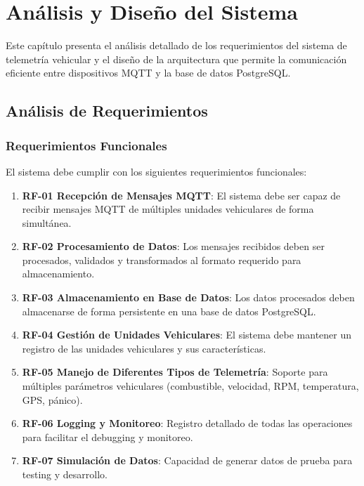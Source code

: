 \chapter{Análisis y Diseño del Sistema}
\label{chap:analisis}

Este capítulo presenta el análisis detallado de los requerimientos del sistema de telemetría vehicular y el diseño de la arquitectura que permite la comunicación eficiente entre dispositivos MQTT y la base de datos PostgreSQL.

\section{Análisis de Requerimientos}

\subsection{Requerimientos Funcionales}

El sistema debe cumplir con los siguientes requerimientos funcionales:

\begin{enumerate}[noitemsep]
    \item \textbf{RF-01 Recepción de Mensajes MQTT}: El sistema debe ser capaz de recibir mensajes MQTT de múltiples unidades vehiculares de forma simultánea.
    
    \item \textbf{RF-02 Procesamiento de Datos}: Los mensajes recibidos deben ser procesados, validados y transformados al formato requerido para almacenamiento.
    
    \item \textbf{RF-03 Almacenamiento en Base de Datos}: Los datos procesados deben almacenarse de forma persistente en una base de datos PostgreSQL.
    
    \item \textbf{RF-04 Gestión de Unidades Vehiculares}: El sistema debe mantener un registro de las unidades vehiculares y sus características.
    
    \item \textbf{RF-05 Manejo de Diferentes Tipos de Telemetría}: Soporte para múltiples parámetros vehiculares (combustible, velocidad, RPM, temperatura, GPS, pánico).
    
    \item \textbf{RF-06 Logging y Monitoreo}: Registro detallado de todas las operaciones para facilitar el debugging y monitoreo.
    
    \item \textbf{RF-07 Simulación de Datos}: Capacidad de generar datos de prueba para testing y desarrollo.
\end{enumerate}

